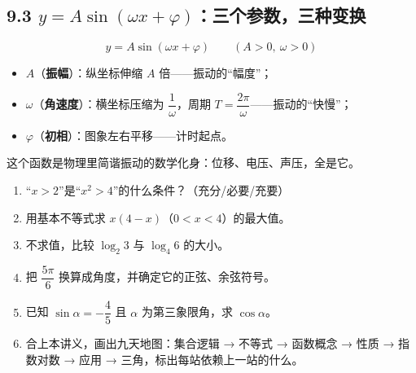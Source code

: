\documentclass[UTF8,a4paper,11pt]{ctexart}
\begin{document}
\subsection*{9.3 $y = A\sin(\omega x + \varphi)$：三个参数，三种变换}

\[
y = A\sin(\omega x + \varphi) \qquad (A>0,\ \omega>0)
\]
\begin{itemize}
  \item $A$（\textbf{振幅}）：纵坐标伸缩 $A$ 倍——振动的“幅度”；
  \item $\omega$（\textbf{角速度}）：横坐标压缩为 $\dfrac{1}{\omega}$，周期 $T = \dfrac{2\pi}{\omega}$——振动的“快慢”；
  \item $\varphi$（\textbf{初相}）：图象左右平移——计时起点。
\end{itemize}
这个函数是物理里简谐振动的数学化身：位移、电压、声压，全是它。

\begin{center}
\end{center}

\begin{exercise}[九天总检验]
\begin{enumerate}
  \item “$x > 2$”是“$x^2 > 4$”的什么条件？（充分/必要/充要）
  \item 用基本不等式求 $x(4-x)$（$0<x<4$）的最大值。
  \item 不求值，比较 $\log_2 3$ 与 $\log_4 6$ 的大小。
  \item 把 $\dfrac{5\pi}{6}$ 换算成角度，并确定它的正弦、余弦符号。
  \item 已知 $\sin\alpha = -\dfrac{4}{5}$ 且 $\alpha$ 为第三象限角，求 $\cos\alpha$。
  \item 合上本讲义，画出九天地图：集合逻辑 → 不等式 → 函数概念 → 性质 → 指数对数 → 应用 → 三角，标出每站依赖上一站的什么。
\end{enumerate}
\end{exercise}
\end{document}
